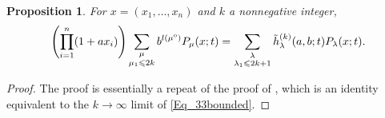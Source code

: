 \documentclass[pdftex]{sigma}
\numberwithin{equation}{section}
\newtheorem{Proposition}[Theorem]{Proposition}
\renewcommand{\leq}{\leqslant}
\newcommand{\odd}{\textup{o}}
\newcommand{\la}{\lambda}
\begin{document}
\begin{Proposition}\label{Prop_33bounded}
For $x=(x_1,\dots,x_n)$ and $k$ a nonnegative integer,
\begin{equation}\label{Eq_33bounded}
\Biggl(\prod_{i=1}^n (1+ax_i)\Biggr)
\sum_{\substack{\mu \\[1pt] \mu_1\leq 2k}} b^{l(\mu^{\odd})}
P_{\mu}(x;t)
=\sum_{\substack{\la \\[1pt] \la_1\leq 2k+1}}
\tilde{h}_{\la}^{(k)}(a,b;t) P_{\la}(x;t).
\end{equation}
\end{Proposition}

\begin{proof}
The proof is essentially a repeat of the proof of
\cite[equation~(3.3)]{W06a}, which is an identity
equivalent to the $k\to\infty$ limit of \eqref{Eq_33bounded}.


\end{proof}
\end{document}
